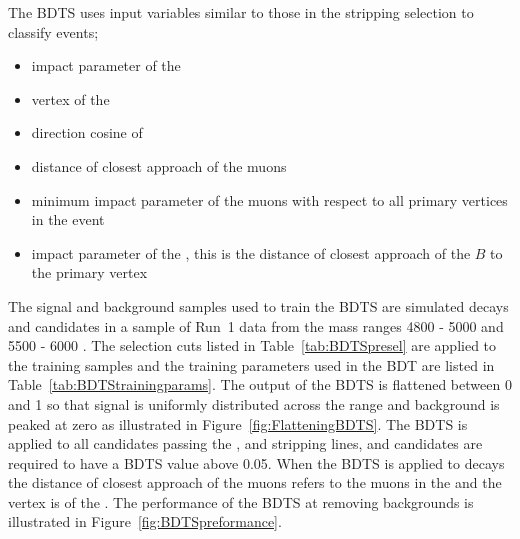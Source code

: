The BDTS uses input variables similar to those in the stripping selection to classify events;
\begin{itemize}
\item impact parameter \chisqd of the \bs
\item vertex \chisqd of the \bs
\item direction cosine of \bs
\item distance of closest approach of the muons
\item minimum impact parameter \chisqd of the muons with respect to all primary vertices in the event
\item impact parameter of the \bs, this is the distance of closest approach of the $B$ to the primary vertex
\end{itemize}
The signal and background samples used to train the BDTS are simulated \bsmumu decays and \bsmumu candidates in a sample of Run~1 data from the mass ranges 4800 - 5000 \mevcc and 5500 - 6000 \mevcc. The selection cuts listed in Table~\ref{tab:BDTSpresel} are applied to the training samples and the training parameters used in the BDT are listed in Table~\ref{tab:BDTStrainingparams}. The output of the BDTS is flattened between 0 and 1 so that signal is uniformly distributed across the range and background is peaked at zero as illustrated in Figure~\ref{fig:FlatteningBDTS}. The BDTS is applied to all candidates passing the \bmumu, \bhh and \bujpsik stripping lines, and candidates are required to have a BDTS value above 0.05. When the BDTS is applied to \bujpsik decays the distance of closest approach of the muons refers to the muons in the \jpsi and the vertex \chisq is of the \jpsi. %
The performance of the BDTS at removing backgrounds is illustrated in Figure~\ref{fig:BDTSpreformance}. %

